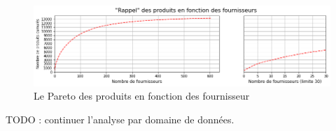                 \begin{figure}[htbp]
                    \begin{center}
                    \includegraphics[width=\linewidth]{img/rappel_produit_par_fournisseur.png}
                    \end{center}
                    \caption{Le Pareto des produits en fonction des fournisseur}
                    \label{fig:rappel_pdt_par_frn}
                \end{figure}

        TODO : continuer l'analyse par domaine de données.

